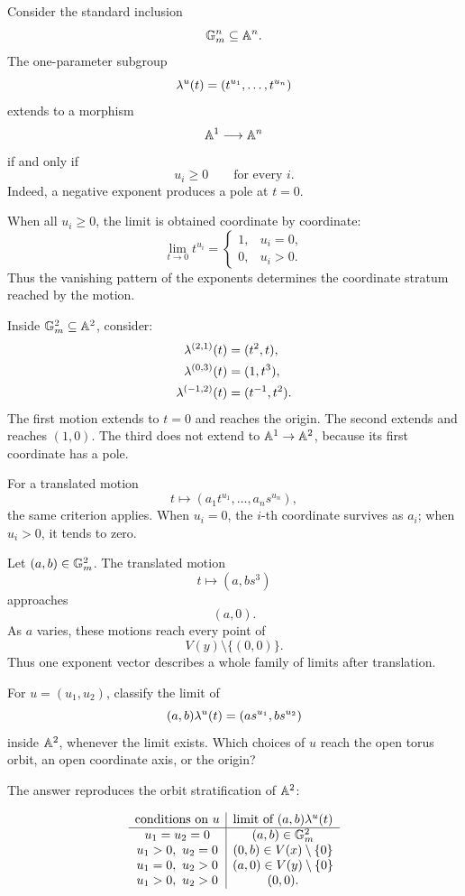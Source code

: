 Consider the standard inclusion
\[
\mathbb{G}_{m}^n\subseteq\mathbb{A}^n.
\]
The one-parameter subgroup
\[
\lambda^{u}(t)
=
(t^{u_1},\ldots,t^{u_n})
\]
extends to a morphism
\[
\mathbb{A}^1\longrightarrow\mathbb{A}^n
\]
if and only if
\[
u_i\geq0
\qquad
\text{for every }i.
\]
Indeed, a negative exponent produces a pole at \(t=0\).

When all \(u_i\geq0\), the limit is obtained coordinate by coordinate:
\[
\lim_{t\to0}t^{u_i}
=
\begin{cases}
1,&u_i=0,\\
0,&u_i>0.
\end{cases}
\]
Thus the vanishing pattern of the exponents determines the coordinate
stratum reached by the motion.

\begin{example}
Inside \(\mathbb{G}_{m}^2\subseteq\mathbb{A}^2\), consider:
\[
\begin{aligned}
\lambda^{(2,1)}(t)&=(t^2,t),\\
\lambda^{(0,3)}(t)&=(1,t^3),\\
\lambda^{(-1,2)}(t)&=(t^{-1},t^2).
\end{aligned}
\]
The first motion extends to \(t=0\) and reaches the origin. The second
extends and reaches \((1,0)\). The third does not extend to
\(\mathbb{A}^1\to\mathbb{A}^2\), because its first coordinate has a pole.
\end{example}

For a translated motion
\[
t\longmapsto(a_1t^{u_1},\ldots,a_ns^{u_n}),
\]
the same criterion applies. When \(u_i=0\), the \(i\)-th coordinate
survives as \(a_i\); when \(u_i>0\), it tends to zero.

\begin{example}
Let \((a,b)\in\mathbb{G}_{m}^2\). The translated motion
\[
t\longmapsto(a,bs^3)
\]
approaches
\[
(a,0).
\]
As \(a\) varies, these motions reach every point of
\[
V(y)\setminus\{(0,0)\}.
\]
Thus one exponent vector describes a whole family of limits after
translation.
\end{example}

\begin{pauseandthink}
For \(u=(u_1,u_2)\), classify the limit of
\[
(a,b)\lambda^{u}(t)
=
(as^{u_1},bs^{u_2})
\]
inside \(\mathbb{A}^2\), whenever the limit exists. Which choices of \(u\)
reach the open torus orbit, an open coordinate axis, or the origin?
\end{pauseandthink}

The answer reproduces the orbit stratification of \(\mathbb{A}^2\):

\[
\begin{array}{c|c}
\text{conditions on }u
&
\text{limit of }(a,b)\lambda^{u}(t)
\\
\hline
u_1=u_2=0
&
(a,b)\in\mathbb{G}_{m}^2
\\
u_1>0,\ u_2=0
&
(0,b)\in V(x)\setminus\{0\}
\\
u_1=0,\ u_2>0
&
(a,0)\in V(y)\setminus\{0\}
\\
u_1>0,\ u_2>0
&
(0,0).
\end{array}
\]

